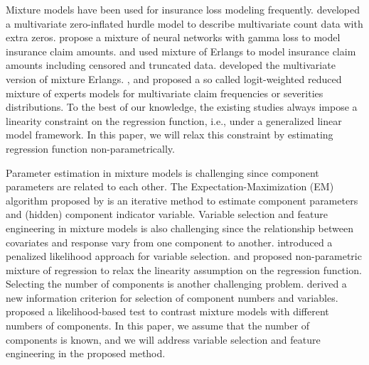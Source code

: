 \documentclass[11pt]{article}
\numberwithin{equation}{section}
\begin{document}
Mixture models have been used for insurance loss modeling frequently.
\citet{zhang2020type, zhang2022new} developed a multivariate zero-inflated hurdle model to describe multivariate count data with extra zeros.
\citet{delong2021gamma} propose a mixture of neural networks with gamma loss to model insurance claim amounts.
\citet{verbelen2015fitting} and \citet{lee2010modeling} used mixture of Erlangs to model insurance claim amounts including censored and truncated data.
\citet{lee2012modeling} developed the multivariate version of mixture Erlangs.
\citet{fung2019class}, \citet{fung2019class2} and \citet{tseung2021lrmoe} proposed a so called logit-weighted reduced mixture of experts models for multivariate claim frequencies or severities distributions.
To the best of our knowledge, the existing studies always impose a linearity constraint on the regression function, i.e., under a generalized linear model framework.
In this paper, we will relax this constraint by estimating regression function non-parametrically.

Parameter estimation in mixture models is challenging since component parameters are related to each other. 
The Expectation-Maximization (EM) algorithm proposed by \citet{dempster1977maximum} is an iterative method to estimate component parameters and (hidden) component indicator variable. 
Variable selection and feature engineering in mixture models  is also challenging since the relationship between covariates and response vary from one component to another.  
\citet{khalili2007variable} introduced a penalized likelihood approach for variable selection.
\citet{huang2013nonparametric} and \citet{huang2012mixture} proposed non-parametric mixture of regression to relax the linearity assumption on the regression function.
Selecting the number of components is another challenging problem.
\citet{naik2007extending} derived a new information criterion for selection of component numbers and variables.
\citet{kasahara2015testing} proposed a likelihood-based test to contrast mixture models with different numbers of components. 
In this paper, we assume that the number of components is known, and we will address variable selection and feature engineering in the proposed method.
\end{document}

